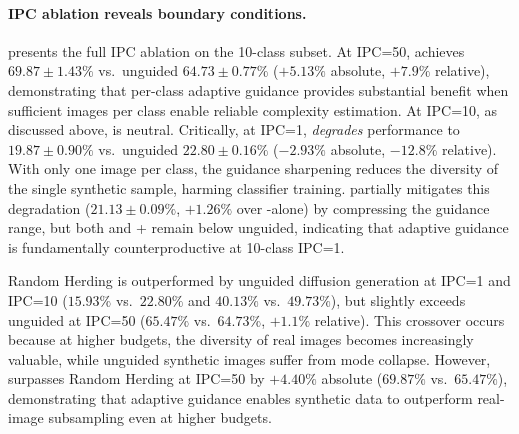 \paragraph{IPC ablation reveals boundary conditions.}
 presents the full IPC ablation on the 10-class subset. At IPC=50, \cags{} achieves $69.87 \pm 1.43\%$ vs.\ unguided $64.73 \pm 0.77\%$ ($+5.13\%$ absolute, $+7.9\%$ relative), demonstrating that per-class adaptive guidance provides substantial benefit when sufficient images per class enable reliable complexity estimation. At IPC=10, as discussed above, \cags{} is neutral. Critically, at IPC=1, \cags{} \emph{degrades} performance to $19.87 \pm 0.90\%$ vs.\ unguided $22.80 \pm 0.16\%$ ($-2.93\%$ absolute, $-12.8\%$ relative). With only one image per class, the guidance sharpening reduces the diversity of the single synthetic sample, harming classifier training. \iast{} partially mitigates this degradation ($21.13 \pm 0.09\%$, $+1.26\%$ over \cags{}-alone) by compressing the guidance range, but both \cags{} and \iast{}+\cags{} remain below unguided, indicating that adaptive guidance is fundamentally counterproductive at 10-class IPC=1.

Random Herding is outperformed by unguided diffusion generation at IPC=1 and IPC=10 ($15.93\%$ vs.\ $22.80\%$ and $40.13\%$ vs.\ $49.73\%$), but slightly exceeds unguided at IPC=50 ($65.47\%$ vs.\ $64.73\%$, $+1.1\%$ relative). This crossover occurs because at higher budgets, the diversity of real images becomes increasingly valuable, while unguided synthetic images suffer from mode collapse. However, \cags{} surpasses Random Herding at IPC=50 by $+4.40\%$ absolute ($69.87\%$ vs.\ $65.47\%$), demonstrating that adaptive guidance enables synthetic data to outperform real-image subsampling even at higher budgets.


